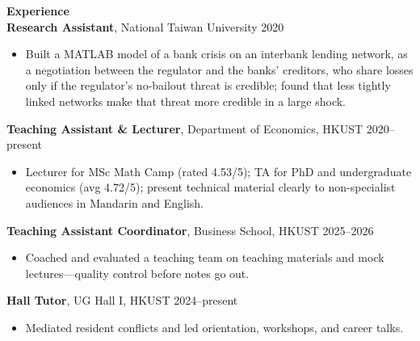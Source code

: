 \documentclass[11pt,letterpaper]{article}
\begin{document}
{\large \textbf{Experience}}\\[-0.5pt]
\textbf{Research Assistant}, National Taiwan University \hfill 2020\\
\vspace{-6pt}
\begin{itemize}
  \item Built a MATLAB model of a bank crisis on an interbank lending network, as a negotiation between the regulator and the banks' creditors, who share losses only if the regulator's no-bailout threat is credible; found that less tightly linked networks make that threat more credible in a large shock.
\end{itemize}
\textbf{Teaching Assistant \& Lecturer}, Department of Economics, HKUST \hfill 2020--present\\
\vspace{-6pt}
\begin{itemize}
  \item Lecturer for MSc Math Camp (rated 4.53/5); TA for PhD and undergraduate economics (avg 4.72/5); present technical material clearly to non-specialist audiences in Mandarin and English.
\end{itemize}
\textbf{Teaching Assistant Coordinator}, Business School, HKUST \hfill 2025--2026\\
\vspace{-6pt}
\begin{itemize}
  \item Coached and evaluated a teaching team on teaching materials and mock lectures---quality control before notes go out.
\end{itemize}
\textbf{Hall Tutor}, UG Hall I, HKUST \hfill 2024--present\\
\vspace{-6pt}
\begin{itemize}
  \item Mediated resident conflicts and led orientation, workshops, and career talks.
\end{itemize}

\vspace{0.15pt}
\end{document}
